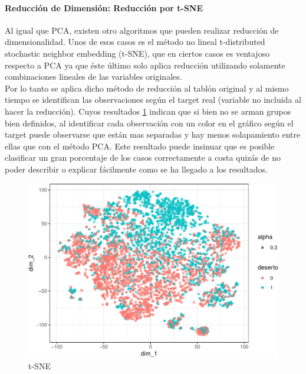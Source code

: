 \paragraph{Reducción de Dimensión: Reducción por t-SNE}\label{reducciuxf3n-por-t-sne}

Al igual que PCA, existen otro algoritmos que pueden realizar reducción
de dimensionalidad. Unos de esos casos es el método no lineal
t-distributed stochastic neighbor embedding (t-SNE), que en ciertos
casos es ventajoso respecto a PCA ya que éste último solo aplica reducción utilizando solamente
combinaciones lineales de las variables originales.\\

Por lo tanto se aplica dicho método de reducción al tablón original y al mismo tiempo se identifican las observaciones según el target real (variable no incluida al hacer la reducción). Cuyos resultados \ref{fig:tsne} indican que si bien no se arman grupos bien definidos,
al identificar cada observación con un color en el gráfico según el
target puede observarse que están mas separadas y hay menos solapamiento entre ellas que con el método PCA. Este resultado puede insinuar que es posible clasificar un gran porcentaje de los casos correctamente a costa quizás de no poder describir o explicar fácilmente como se ha llegado a los resultados.


\begin{figure}[!htb]
	\centering
	\includegraphics{imagenes/reduccion_dimension/unnamed-chunk-11-1.pdf}
	\caption{t-SNE}
	\label{fig:tsne}
\end{figure}

\clearpage





